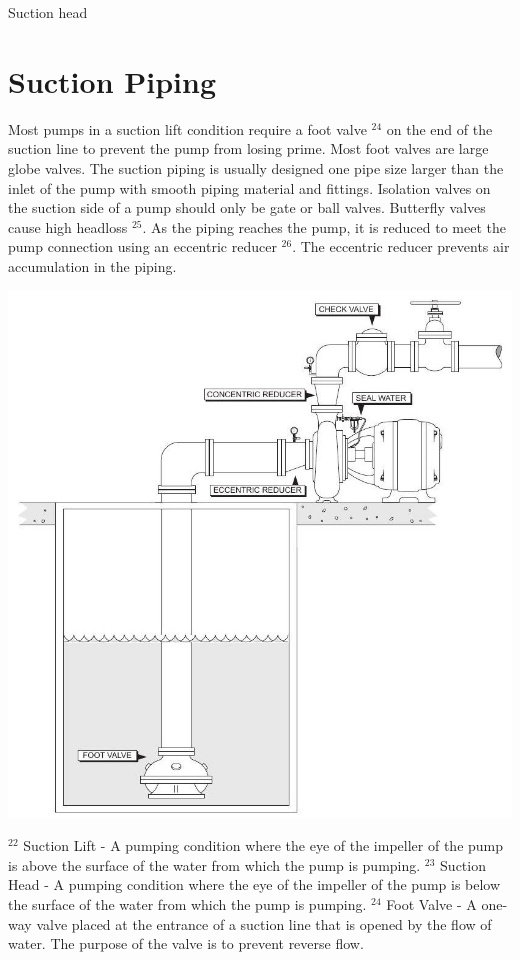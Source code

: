 \documentclass[10pt]{article}
\begin{document}
Suction head

\section{Suction Piping}
Most pumps in a suction lift condition require a foot valve $^{24}$ on the end of the suction line to prevent the pump from losing prime. Most foot valves are large globe valves. The suction piping is usually designed one pipe size larger than the inlet of the pump with smooth piping material and fittings. Isolation valves on the suction side of a pump should only be gate or ball valves. Butterfly valves cause high headloss ${ }^{25}$. As the piping reaches the pump, it is reduced to meet the pump connection using an eccentric reducer ${ }^{26}$. The eccentric reducer prevents air accumulation in the piping.

\includegraphics[max width=\textwidth]{SuctionPiping}

${ }^{22}$ Suction Lift - A pumping condition where the eye of the impeller of the pump is above the surface of the water from which the pump is pumping. ${ }^{23}$ Suction Head - A pumping condition where the eye of the impeller of the pump is below the surface of the water from which the pump is pumping. ${ }^{24}$ Foot Valve - A one-way valve placed at the entrance of a suction line that is opened by the flow of water. The purpose of the valve is to prevent reverse flow.
\end{document}
